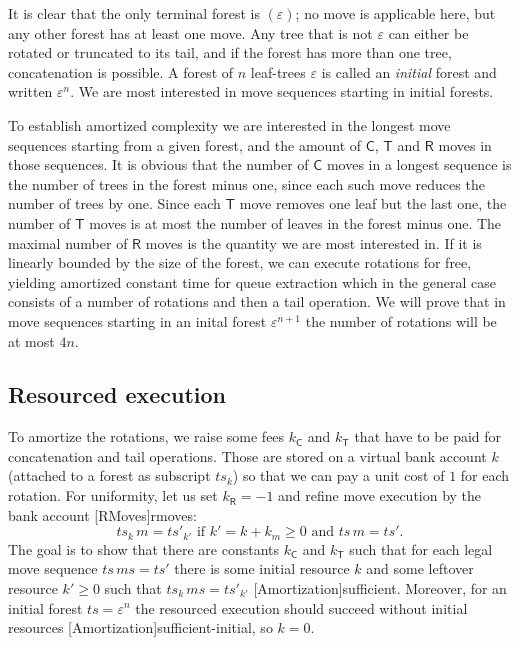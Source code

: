 \documentclass[svgnames,dvipsnames,table,review%
]{jfp-epi}
\newcommand{\tC}{\ensuremath{\mathsf{C}}}
\newcommand{\tR}{\ensuremath{\mathsf{R}}}
\newcommand{\tT}{\ensuremath{\mathsf{T}}}
\newcommand{\vms}{\ensuremath{\mathit{ms}}}
\newcommand{\vts}{\ensuremath{\mathit{ts}}}
\newcommand{\vtsp}{\ensuremath{\mathit{ts'}}}
\begin{document}
It is clear that the only terminal forest is $(ε)$; no move is applicable here, but any other forest has at least one move.  Any tree that is not $ε$ can either be rotated or truncated to its tail, and if the forest has more than one tree, concatenation is possible.
A forest of $n$ leaf-trees $\varepsilon$ is called an \emph{initial} forest and written $\varepsilon^n$.
We are most interested in move sequences starting in initial forests.

To establish amortized complexity we are interested in the longest move sequences starting from a given forest, and the amount of $\tC$, $\tT$ and $\tR$ moves in those sequences.
It is obvious that the number of $\tC$ moves in a longest sequence is the number of trees in the forest minus one, since each such move reduces the number of trees by one.
Since each $\tT$ move removes one leaf but the last one, the number of $\tT$ moves is at most the number of leaves in the forest minus one.
The maximal number of $\tR$ moves is the quantity we are most interested in.
If it is linearly bounded by the size of the forest, we can execute rotations for free, yielding amortized constant time for queue extraction which in the general case consists of a number of rotations and then a tail operation.
We will prove that in move sequences starting in an inital forest $\varepsilon^{n+1}$ the number of rotations will be at most $4n$.

\subsection{Resourced execution}

To amortize the rotations, we raise some fees $k_\tC$ and $k_\tT$ that have to be paid for concatenation and tail operations.
Those are stored on a virtual bank account $k$ (attached to a forest as subscript $\vts_k$) so that we can pay a unit cost of $1$ for each rotation.
For uniformity, let us set $k_\tR = -1$ and refine move execution by the bank account [RMoves]{rmoves}:
\[
  \vts_k \, m = \vtsp_{k'} \mbox{ if } k' = k + k_m \geq 0 \mbox{ and } \vts \, m = \vtsp
  .
\]
The goal is to show that there are constants $k_\tC$ and $k_\tT$ such that for each legal move sequence $\vts \, \vms = \vtsp$ there is some initial resource $k$ and some leftover resource $k' \geq 0$ such that $\vts_k \, \vms = \vtsp_{k'}$ [Amortization]{sufficient}.
Moreover, for an initial forest $\vts = \varepsilon^n$ the resourced execution should succeed without initial resources [Amortization]{sufficient-initial}, so $k=0$.
\end{document}
